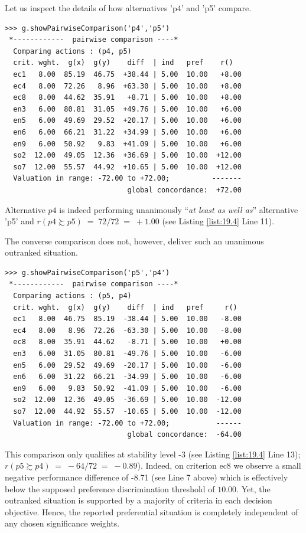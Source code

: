 Let us inspect the details of how alternatives 'p4' and 'p5' compare. 
\begin{lstlisting}
>>> g.showPairwiseComparison('p4','p5')
 *------------  pairwise comparison ----*
  Comparing actions : (p4, p5)
  crit. wght.  g(x)  g(y)    diff  | ind   pref    r()
  ec1   8.00  85.19  46.75  +38.44 | 5.00  10.00   +8.00
  ec4   8.00  72.26   8.96  +63.30 | 5.00  10.00   +8.00
  ec8   8.00  44.62  35.91   +8.71 | 5.00  10.00   +8.00
  en3   6.00  80.81  31.05  +49.76 | 5.00  10.00   +6.00
  en5   6.00  49.69  29.52  +20.17 | 5.00  10.00   +6.00
  en6   6.00  66.21  31.22  +34.99 | 5.00  10.00   +6.00
  en9   6.00  50.92   9.83  +41.09 | 5.00  10.00   +6.00
  so2  12.00  49.05  12.36  +36.69 | 5.00  10.00  +12.00
  so7  12.00  55.57  44.92  +10.65 | 5.00  10.00  +12.00
  Valuation in range: -72.00 to +72.00;          -------
                             global concordance:  +72.00
\end{lstlisting}
Alternative $p4$ is indeed performing unanimously ``\emph{at least as well as}'' alternative 'p5' and $r(p4 \succsim p5)\; =\; 72/72\; =\; +1.00$ (see Listing \ref{list:19.4} Line 11).

The converse comparison does not, however, deliver such an unanimous outranked situation. 
\begin{lstlisting}
>>> g.showPairwiseComparison('p5','p4')
 *------------  pairwise comparison ----*
  Comparing actions : (p5, p4)
  crit. wght.  g(x)  g(y)    diff  | ind   pref     r()
  ec1   8.00  46.75  85.19  -38.44 | 5.00  10.00   -8.00
  ec4   8.00   8.96  72.26  -63.30 | 5.00  10.00   -8.00
  ec8   8.00  35.91  44.62   -8.71 | 5.00  10.00   +0.00
  en3   6.00  31.05  80.81  -49.76 | 5.00  10.00   -6.00
  en5   6.00  29.52  49.69  -20.17 | 5.00  10.00   -6.00
  en6   6.00  31.22  66.21  -34.99 | 5.00  10.00   -6.00
  en9   6.00   9.83  50.92  -41.09 | 5.00  10.00   -6.00
  so2  12.00  12.36  49.05  -36.69 | 5.00  10.00  -12.00
  so7  12.00  44.92  55.57  -10.65 | 5.00  10.00  -12.00
  Valuation in range: -72.00 to +72.00;           ------
                             global concordance:  -64.00
\end{lstlisting}
This comparison only qualifies at stability level -3 (see Listing \ref{list:19.4} Line 13); $r(p5 \succsim p4)\; =\; -64/72\; =\; -0.89$). Indeed, on criterion ec8 we observe a small negative performance difference of -8.71 (see Line 7 above) which is effectively below the supposed preference discrimination threshold of $10.00$. Yet, the outranked situation is supported by a majority of criteria in each decision objective. Hence, the reported preferential situation is completely independent of any chosen significance weights.

